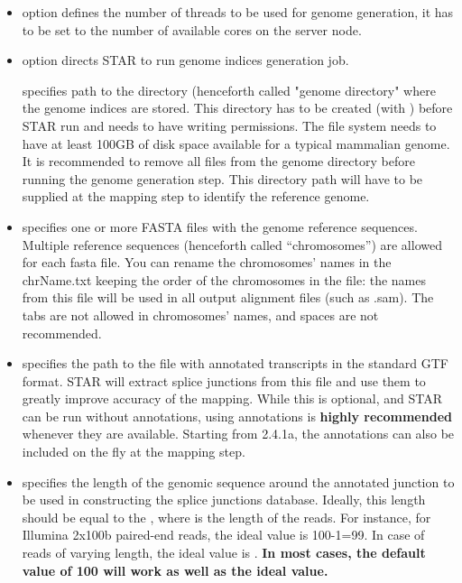 \documentclass[12pt]{article}
\begin{document}
\begin{itemize}
\item[]
 option defines the number of threads to be used for genome generation, it has to be set to the number of available cores on the server node.

\item[]
  option directs STAR to run genome indices generation job.

 specifies path to the directory (henceforth called "genome directory" where the genome indices are stored. This directory has to be created (with ) before STAR run and needs to have writing permissions. The file system needs to have at least 100GB of disk space available for a typical mammalian genome. It is recommended to remove all files from the genome directory before running the genome generation step. This directory path will have to be supplied at the mapping step to identify the reference genome.

\item[]
 specifies one or more FASTA files with the genome reference sequences. Multiple reference sequences (henceforth called “chromosomes”) are allowed for each fasta file. You can rename the chromosomes’ names in the chrName.txt keeping the order of the chromosomes in the file: the names from this file will be used in all output alignment files (such as .sam). The tabs are not allowed in chromosomes’ names, and spaces are not recommended.

\item[]
 specifies the path to the file with annotated transcripts in the standard GTF format. STAR will extract splice junctions from this file and use them to greatly improve accuracy of the mapping. While this is optional, and STAR can be run without annotations, using annotations is \textbf{highly recommended} whenever they are available. Starting from 2.4.1a, the annotations can also be included on the fly at the mapping step.

\item[]
 specifies the length of the genomic sequence around the annotated junction to be used in constructing the splice junctions database. Ideally, this length should be equal to the , where  is the length of the reads. For instance, for Illumina 2x100b paired-end reads, the ideal value is 100-1=99. In case of reads of varying length, the ideal value is . \textbf{In most cases, the default value of 100 will work as well as the ideal value.}
\end{itemize}
\end{document}
